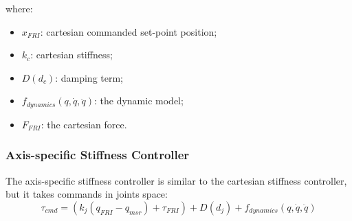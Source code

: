 where:
\begin{itemize}
\item $x_{FRI}$: cartesian commanded set-point position;
\item $k_c$: cartesian stiffness;
\item $D(d_c)$: damping term;
\item $f_{dynamics}(q,\dot{q},\ddot{q})$: the dynamic model;
\item $F_{FRI}$: the cartesian force.
\end{itemize}

\subsubsection*{Axis-specific Stiffness Controller}
The axis-specific stiffness controller is similar to the cartesian stiffness controller, but it takes commands in joints space:
\begin{equation}
\tau_{cmd} = (k_j(q_{FRI} - q_{msr}) + \tau_{FRI}) + D(d_j) + f_{dynamics}(q,\dot{q},\ddot{q})
\label{eq:axisspecificstiffnesscontroller}
\end{equation}

\newpage